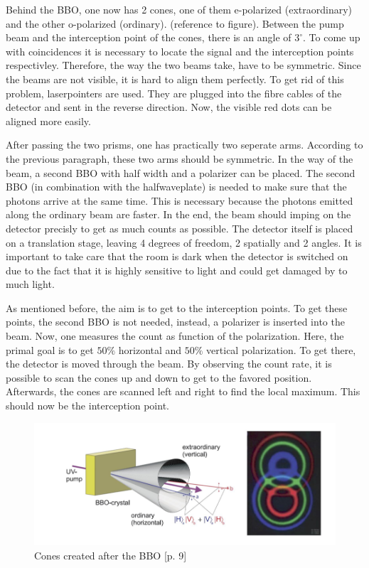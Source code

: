 \documentclass[12pt,a4paper]{article}
\begin{document}
\begin{multicols}{2}
 Behind the BBO, one now has 2 cones, one of them e-polarized (extraordinary) and the other o-polarized (ordinary). (reference to figure). Between the pump beam and the interception point of the cones, there is an angle of $3^\circ$. To come up with coincidences it is  necessary to locate the signal and the interception points respectivley. Therefore, the way the two beams take, have to be symmetric. Since the beams are not visible, it is hard to align them perfectly. To get rid of this problem, laserpointers are used. They are plugged into the fibre cables of the detector and sent in the reverse direction. Now, the visible red dots can be aligned more easily.
 
 
 After passing the two prisms, one has practically two seperate arms. According to the previous paragraph, these two arms should be symmetric. In the way of the beam, a second BBO with half width and a polarizer can be placed. The second BBO (in combination with the halfwaveplate) is needed to make sure that the photons arrive at the same time. This is necessary because the photons emitted along the ordinary beam are faster. In the end, the beam should imping on the detector precisly to get as much counts as possible. The detector itself is placed on a translation stage, leaving 4 degrees of freedom, 2 spatially and 2 angles. It is important to take care that the room is dark when the detector is switched on due to the fact that it is highly sensitive to light and could get damaged by to much light.
 
 As mentioned before, the aim is to get to the interception points. To get these points, the second BBO is not needed, instead, a polarizer is inserted into the beam. Now, one measures the count as function of the polarization. Here, the primal goal is to get $50\%$ horizontal and $50\%$ vertical polarization. To get there, the detector is moved through the beam. By observing the count rate, it is possible to scan the cones up and down to get to the favored position. Afterwards, the cones are scanned left and right to find the local maximum. This should now be the interception point.
 


\begin{figure}[H]
 \centering
 \includegraphics[scale=0.7]{./figures/cones.png}
 \caption{Cones created after the BBO \cite{physikwiki}[p. 9]}
 \label{fig:cones}
\end{figure}


\end{multicols}
\end{document}

